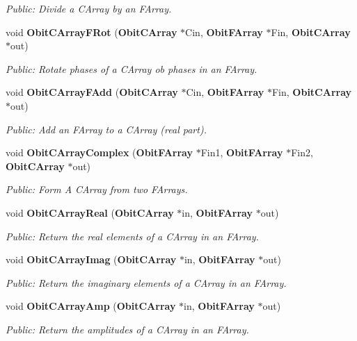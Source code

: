 \begin{CompactItemize}
\begin{CompactList}\small\item\em Public: Divide a CArray by an FArray. \item\end{CompactList}\item 
void {\bf Obit\-CArray\-FRot} ({\bf Obit\-CArray} $\ast$Cin, {\bf Obit\-FArray} $\ast$Fin, {\bf Obit\-CArray} $\ast$out)
\begin{CompactList}\small\item\em Public: Rotate phases of a CArray ob phases in an FArray. \item\end{CompactList}\item 
void {\bf Obit\-CArray\-FAdd} ({\bf Obit\-CArray} $\ast$Cin, {\bf Obit\-FArray} $\ast$Fin, {\bf Obit\-CArray} $\ast$out)
\begin{CompactList}\small\item\em Public: Add an FArray to a CArray (real part). \item\end{CompactList}\item 
void {\bf Obit\-CArray\-Complex} ({\bf Obit\-FArray} $\ast$Fin1, {\bf Obit\-FArray} $\ast$Fin2, {\bf Obit\-CArray} $\ast$out)
\begin{CompactList}\small\item\em Public: Form A CArray from two FArrays. \item\end{CompactList}\item 
void {\bf Obit\-CArray\-Real} ({\bf Obit\-CArray} $\ast$in, {\bf Obit\-FArray} $\ast$out)
\begin{CompactList}\small\item\em Public: Return the real elements of a CArray in an FArray. \item\end{CompactList}\item 
void {\bf Obit\-CArray\-Imag} ({\bf Obit\-CArray} $\ast$in, {\bf Obit\-FArray} $\ast$out)
\begin{CompactList}\small\item\em Public: Return the imaginary elements of a CArray in an FArray. \item\end{CompactList}\item 
void {\bf Obit\-CArray\-Amp} ({\bf Obit\-CArray} $\ast$in, {\bf Obit\-FArray} $\ast$out)
\begin{CompactList}\small\item\em Public: Return the amplitudes of a CArray in an FArray. \item\end{CompactList}\item 

\end{CompactItemize}
